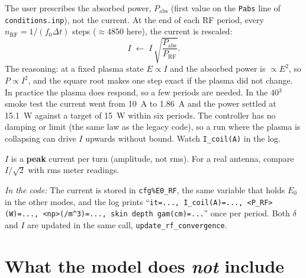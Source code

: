 \documentclass[11pt,a4paper]{article}
\newcommand{\code}[1]{\texttt{#1}}
\newcommand{\incode}[1]{\par\smallskip\noindent\textit{In the code:} #1\par\smallskip}
\begin{document}
The user prescribes the absorbed power, $P_{\mathrm{abs}}$ (first value on
the \code{Pabs} line of \code{conditions.inp}), not the current. At the end
of each RF period, every $n_{\mathrm{RF}} = 1/(f_0\Delta t)$ steps
($\approx 4850$ here), the current is rescaled:
\begin{equation}
  I \;\leftarrow\; I\,\sqrt{\frac{P_{\mathrm{abs}}}{P_{\mathrm{RF}}}} .
\end{equation}
The reasoning: at a fixed plasma state $E\propto I$ and the absorbed power
is $\propto E^2$, so $P\propto I^2$, and the square root makes one step
exact if the plasma did not change. In practice the plasma does respond, so
a few periods are needed. In the 40$^3$ smoke test the current went from
\SI{10}{A} to \SI{1.86}{A} and the power settled at \SI{15.1}{W} against a
target of \SI{15}{W} within six periods. The controller has no damping or
limit (the same law as the legacy code), so a run where the plasma is
collapsing can drive $I$ upwards without bound. Watch \code{I\_coil(A)} in
the log.

$I$ is a \textbf{peak} current per turn (amplitude, not rms). For a real
antenna, compare $I/\sqrt2$ with rms meter readings.

\incode{The current is stored in \code{cfg\%E0\_RF}, the same variable
that holds $E_0$ in the other modes, and the log prints
``\code{it=..., I\_coil(A)=..., <P\_RF>(W)=..., <np>(/m\^{}3)=..., skin depth
gam(cm)=...}'' once per period. Both $\delta$ and $I$ are updated in the
same call, \code{update\_rf\_convergence}.}

\section{What the model does \emph{not} include}
\label{sec:limits}
\end{document}
